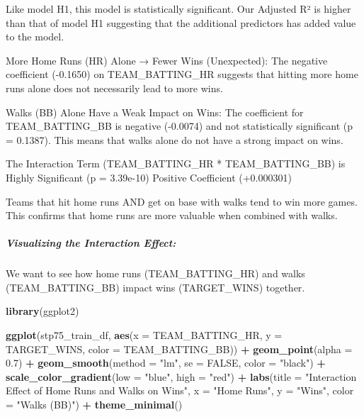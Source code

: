 \documentclass[
]{article}
\newenvironment{Shaded}{\begin{snugshade}}{\end{snugshade}}
\newcommand{\AttributeTok}[1]{\textcolor[rgb]{0.13,0.29,0.53}{#1}}
\newcommand{\ConstantTok}[1]{\textcolor[rgb]{0.56,0.35,0.01}{#1}}
\newcommand{\FloatTok}[1]{\textcolor[rgb]{0.00,0.00,0.81}{#1}}
\newcommand{\FunctionTok}[1]{\textcolor[rgb]{0.13,0.29,0.53}{\textbf{#1}}}
\newcommand{\NormalTok}[1]{#1}
\newcommand{\SpecialCharTok}[1]{\textcolor[rgb]{0.81,0.36,0.00}{\textbf{#1}}}
\newcommand{\StringTok}[1]{\textcolor[rgb]{0.31,0.60,0.02}{#1}}
\begin{document}
Like model H1, this model is statistically significant. Our Adjusted R²
is higher than that of model H1 suggesting that the additional
predictors has added value to the model.

More Home Runs (HR) Alone → Fewer Wins (Unexpected): The negative
coefficient (-0.1650) on TEAM\_BATTING\_HR suggests that hitting more
home runs alone does not necessarily lead to more wins.

Walks (BB) Alone Have a Weak Impact on Wins: The coefficient for
TEAM\_BATTING\_BB is negative (-0.0074) and not statistically
significant (p = 0.1387). This means that walks alone do not have a
strong impact on wins.

The Interaction Term (TEAM\_BATTING\_HR * TEAM\_BATTING\_BB) is Highly
Significant (p = 3.39e-10) Positive Coefficient (+0.000301)

Teams that hit home runs AND get on base with walks tend to win more
games. This confirms that home runs are more valuable when combined with
walks.

\subparagraph{Visualizing the Interaction
Effect:}\label{visualizing-the-interaction-effect}

We want to see how home runs (TEAM\_BATTING\_HR) and walks
(TEAM\_BATTING\_BB) impact wins (TARGET\_WINS) together.

\begin{Shaded}
\begin{Highlighting}[]
\FunctionTok{library}\NormalTok{(ggplot2)}

\FunctionTok{ggplot}\NormalTok{(stp75\_train\_df, }\FunctionTok{aes}\NormalTok{(}\AttributeTok{x =}\NormalTok{ TEAM\_BATTING\_HR, }\AttributeTok{y =}\NormalTok{ TARGET\_WINS, }\AttributeTok{color =}\NormalTok{ TEAM\_BATTING\_BB)) }\SpecialCharTok{+}
  \FunctionTok{geom\_point}\NormalTok{(}\AttributeTok{alpha =} \FloatTok{0.7}\NormalTok{) }\SpecialCharTok{+} 
  \FunctionTok{geom\_smooth}\NormalTok{(}\AttributeTok{method =} \StringTok{"lm"}\NormalTok{, }\AttributeTok{se =} \ConstantTok{FALSE}\NormalTok{, }\AttributeTok{color =} \StringTok{"black"}\NormalTok{) }\SpecialCharTok{+}
  \FunctionTok{scale\_color\_gradient}\NormalTok{(}\AttributeTok{low =} \StringTok{"blue"}\NormalTok{, }\AttributeTok{high =} \StringTok{"red"}\NormalTok{) }\SpecialCharTok{+}
  \FunctionTok{labs}\NormalTok{(}\AttributeTok{title =} \StringTok{"Interaction Effect of Home Runs and Walks on Wins"}\NormalTok{,}
       \AttributeTok{x =} \StringTok{"Home Runs"}\NormalTok{,}
       \AttributeTok{y =} \StringTok{"Wins"}\NormalTok{,}
       \AttributeTok{color =} \StringTok{"Walks (BB)"}\NormalTok{) }\SpecialCharTok{+}
  \FunctionTok{theme\_minimal}\NormalTok{()}
\end{Highlighting}
\end{Shaded}
\end{document}
